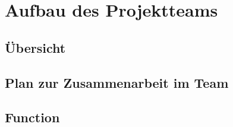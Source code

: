 \chapter{Aufbau des Projektteams}

\section{Übersicht}

\section{Plan zur Zusammenarbeit im Team}

\section{Function}